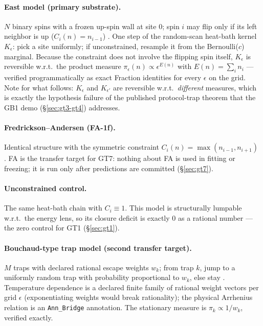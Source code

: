 \documentclass[11pt]{article}
\theoremstyle{definition}
\begin{document}
\paragraph{East model (primary substrate).} $N$ binary spins with a frozen up-spin wall at site
$0$; spin $i$ may flip only if its left neighbor is up ($C_i(n) = n_{i-1}$)
\cite{jackle-eisinger-1991}. One step of the random-scan heat-bath kernel $K_\epsilon$: pick a
site uniformly; if unconstrained, resample it from the Bernoulli($c$) marginal. Because the
constraint does not involve the flipping spin itself, $K_\epsilon$ is reversible w.r.t.\ the
product measure $\pi_\epsilon(n) \propto \epsilon^{E(n)}$ with $E(n) = \sum_i n_i$ --- verified
programmatically as exact Fraction identities for every $\epsilon$ on the grid. Note for what
follows: $K_\epsilon$ and $K_{\epsilon'}$ are reversible w.r.t.\ \emph{different} measures, which
is exactly the hypothesis failure of the published protocol-trap theorem that the GB1 demo
(\S\ref{sec:gt3-gt4}) addresses.

\paragraph{Fredrickson--Andersen (FA-1f).} Identical structure with the symmetric constraint
$C_i(n) = \max(n_{i-1}, n_{i+1})$ \cite{fredrickson-andersen-1984}. FA is the transfer target for
GT7: nothing about FA is used in fitting or freezing; it is run only after predictions are
committed (\S\ref{sec:gt7}).

\paragraph{Unconstrained control.} The same heat-bath chain with $C_i \equiv 1$. This model is
structurally lumpable w.r.t.\ the energy lens, so its closure deficit is exactly $0$ as a rational
number --- the zero control for GT1 (\S\ref{sec:gt1}).

\paragraph{Bouchaud-type trap model (second transfer target).} $M$ traps with declared rational
escape weights $w_k$; from trap $k$, jump to a uniformly random trap with probability proportional
to $w_k$, else stay \cite{bouchaud-1992,monthus-bouchaud-1996}. Temperature dependence is a
declared finite family of rational weight vectors per grid $\epsilon$ (exponentiating weights
would break rationality); the physical Arrhenius relation is an \texttt{Ann\_Bridge} annotation.
The stationary measure is $\pi_k \propto 1/w_k$, verified exactly.
\end{document}
